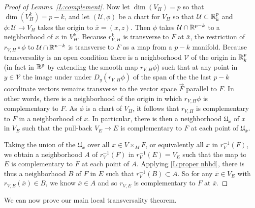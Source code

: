 \begin{proof}[Proof of Lemma~\ref{L:complement}]
	Now let $\dim(V_H) = p$ so that $\dim(V_H^k) = p - k$, and
	let $(\mathcal U, \phi)$ be a chart for $V_H$ so that $\mathcal U \subset \mathbb{R}^p_k$ and $\phi \colon \mathcal U \to V_H$ takes the origin to $\bar{x} = (x,z)$.
	Then $\phi$ takes $\mathcal U \cap \mathbb{R}^{p-k}$ to a neighborhood of $x$ in $V_H^k$.
	Because $r^k_{V,H}$ is transverse to $F$ at $\bar{x}$, the restriction of $r_{V,H} \circ \phi$ to $\mathcal U \cap \mathbb{R}^{n-k}$ is transverse to $F$ as a map from a $p-k$ manifold.
	Because transversality is an open condition there is a neighborhood $\mathcal V$ of the origin in $\mathbb{R}^p_k$ (in fact in $\mathbb{R}^p$ by extending the smooth map $r_{V,H} \phi$) such that at any point in $y \in \mathcal V$ the image under under $D_y(r_{V,H} \phi)$ of the span of the the last $p-k$ coordinate vectors remains transverse to the vector space $\vec F$ parallel to $F$.
	In other words, there is a neighborhood of the origin in which $r_{V,H} \phi$ is complementary to $F$.
	As $\phi$ is a chart of $V_H$, it follows that $r_{V,H}$ is complementary to $F$ in a neighborhood of $\bar{x}$.
	In particular, there is then a neighborhood $\mathfrak U_{\bar{x}}$ of $\bar{x}$ in $V_E$ such that the pull-back $V_E \to E$ is complementary to $F$ at each point of $\mathfrak U_{\bar{x}}$.

	Taking the union of the $\mathfrak U_{\bar{x}}$ over all $\bar{x} \in V \times_M F$, or equivalently all $x$ in $r_V^{-1}(F)$, we obtain a neighborhood $A$ of $r_V^{-1}(F)$ in  $r_V^{-1}(E) = V_E$ such that the map to $E$ is complementary to $F$ at each point of $A$.
	Applying  \cref{L:proper nbhd}, there is thus a neighborhood $B$ of $F$ in $E$ such that $r_V^{-1}(B) \subset A$.
	So for any $\bar{x} \in V_E$ with $r_{V,E} (\bar{x}) \in B$, we know $\bar{x} \in A$ and so $r_{V,E}$ is complementary to $F$ at $\bar x$.
\end{proof}

We can now prove our main local transversality theorem.



